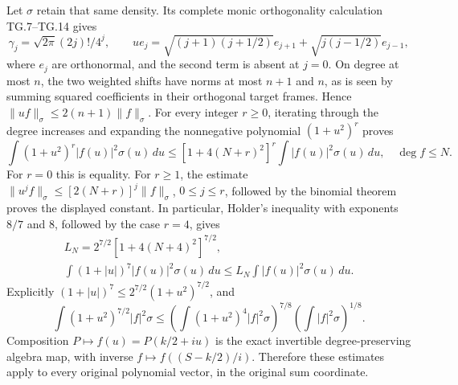 Let \(\sigma\) retain that same density. Its complete monic
orthogonality calculation TG.7--TG.14 gives
\[
 \gamma_j=\sqrt{2\pi}(2j)!/4^j,\qquad
 u e_j=\sqrt{(j+1)(j+1/2)}e_{j+1}
           +\sqrt{j(j-1/2)}e_{j-1},
 \tag{PGD.19}\label{eq:pgd-Gamma-recurrence}
\]
where \(e_j\) are orthonormal, and the second term is absent at
\(j=0\). On degree at most \(n\), the two weighted shifts have
norms at most \(n+1\) and \(n\), as is seen by summing squared
coefficients in their orthogonal target frames. Hence
\(\|uf\|_\sigma\leq2(n+1)\|f\|_\sigma\).
For every integer \(r\geq0\), iterating through the degree increases
and expanding the nonnegative polynomial \((1+u^2)^r\) proves
\[
 \int(1+u^2)^r|f(u)|^2\sigma(u)\,du
       \leq[1+4(N+r)^2]^r\int|f(u)|^2\sigma(u)\,du,
 \quad\deg f\leq N.
 \tag{PGD.20}\label{eq:pgd-integer-multiplier}
\]
For \(r=0\) this is equality. For \(r\geq1\), the estimate
\(\|u^jf\|_\sigma\leq[2(N+r)]^j\|f\|_\sigma\),
\(0\leq j\leq r\), followed by the binomial theorem proves the
displayed constant. In particular, Holder's inequality with exponents
\(8/7\) and \(8\), followed by the case \(r=4\), gives
\[
 \begin{gathered}
 L_N=2^{7/2}[1+4(N+4)^2]^{7/2},\\
 \int(1+|u|)^7|f(u)|^2\sigma(u)\,du
                \leq L_N\int|f(u)|^2\sigma(u)\,du.
 \end{gathered}
 \tag{PGD.21}\label{eq:pgd-seven-multiplier}
\]
Explicitly \((1+|u|)^7\leq2^{7/2}(1+u^2)^{7/2}\), and
\[
 \int(1+u^2)^{7/2}|f|^2\sigma
 \leq\left(\int(1+u^2)^4|f|^2\sigma\right)^{7/8}
        \left(\int|f|^2\sigma\right)^{1/8}.
\]
Composition \(P\mapsto f(u)=P(k/2+iu)\) is the exact invertible
degree-preserving algebra map, with inverse
\(f\mapsto f((S-k/2)/i)\). Therefore these estimates apply to
every original polynomial vector, in the original sum coordinate.

